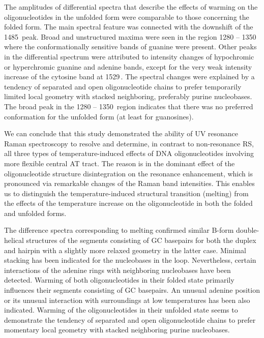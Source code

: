 The amplitudes of differential spectra that describe the effects of warming on
the oligonucleotides in the unfolded form were comparable to those concerning
the folded form.
The main spectral feature was connected with the downshift of the 1485\,\icm{}
peak.
Broad and unstructured maxima were seen in the region 1280 -- 1350\,\icm{}
where the conformationally sensitive bands of guanine were present.
Other peaks in the differential spectrum were attributed to intensity changes
of hypochromic or hyperchromic guanine and adenine bands, except for the very
weak intensity increase of the cytosine band at 1529\,\icm{}.
The spectral changes were explained by a tendency of separated and open
oligonucleotide chains to prefer temporarily limited local geometry with
stacked neighboring, preferably purine nucleobases.
The broad peak in the 1280 -- 1350\,\icm{} region indicates that there was no
preferred conformation for the unfolded form (at least for guanosines).

We can conclude that this study demonstrated the ability of UV resonance Raman
spectroscopy to resolve and determine, in contrast to non-resonance RS, all
three types of temperature-induced effects of DNA oligonucleotides involving
more flexible central AT tract.
The reason is in the dominant effect of the oligonucleotide structure
disintegration on the resonance enhancement, which is pronounced via remarkable
changes of the Raman band intensities.
This enables us to distinguish the temperature-induced structural transition
(melting) from the effects of the temperature increase on the oligonucleotide
in both the folded and unfolded forms.

The difference spectra corresponding to melting confirmed similar B-form
double-helical structures of the segments consisting of GC basepairs for both
the duplex and hairpin with a slightly more relaxed geometry in the latter
case.
Minimal stacking has been indicated for the nucleobases in the loop.
Nevertheless, certain interactions of the adenine rings with neighboring
nucleobases have been detected.
Warming of both oligonucleotides in their folded state primarily influences
their segments consisting of GC basepairs.
An unusual adenine position or its unusual interaction with surroundings at low
temperatures has been also indicated.
Warming of the oligonucleotides in their unfolded state seems to demonstrate
the tendency of separated and open oligonucleotide chains to prefer momentary
local geometry with stacked neighboring purine nucleobases.
